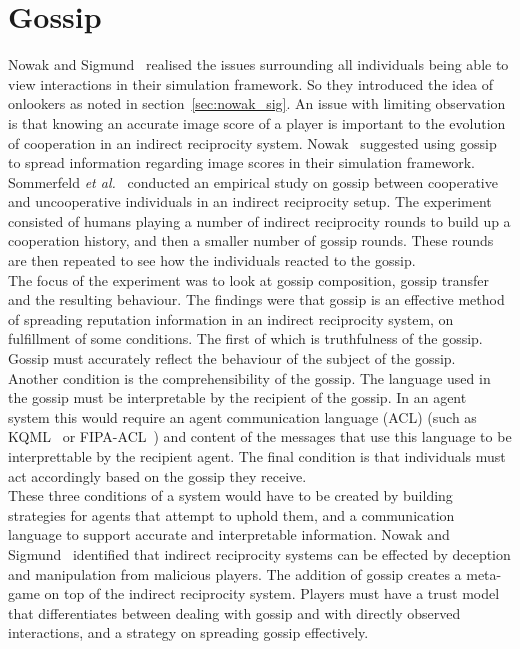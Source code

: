 \documentclass[]{final_report}
\begin{document}
\section{Gossip}
Nowak and Sigmund~\cite{evol_indirect_image} realised the issues surrounding all individuals being able to view interactions in their simulation framework. So they introduced the idea of onlookers as noted in section~\ref{sec:nowak_sig}. An issue with limiting observation is that knowing an accurate image score of a player is important to the evolution of cooperation in an indirect reciprocity system. Nowak~\cite{five_rules_coop} suggested using gossip to spread information regarding image scores in their simulation framework.\\
Sommerfeld \textit{et al.}~\cite{gossip_alt} conducted an empirical study on gossip between cooperative and uncooperative individuals in an indirect reciprocity setup. The experiment consisted of humans playing a number of indirect reciprocity rounds to build up a cooperation history, and then a smaller number of gossip rounds. These rounds are then repeated to see how the individuals reacted to the gossip.\\
The focus of the experiment was to look at gossip composition, gossip transfer and the resulting behaviour. The findings were that gossip is an effective method of spreading reputation information in an indirect reciprocity system, on fulfillment of some conditions. The first of which is truthfulness of the gossip. Gossip must accurately reflect the behaviour of the subject of the gossip.\\
Another condition is the comprehensibility of the gossip. The language used in the gossip must be interpretable by the recipient of the gossip. In an agent system this would require an agent communication language (ACL) (such as KQML~\cite{finin1994kqml} or FIPA-ACL~\cite{o1998fipa}) and content of the messages that use this language to be interprettable by the recipient agent. The final condition is that individuals must act accordingly based on the gossip they receive.\\
These three conditions of a system would have to be created by building strategies for agents that attempt to uphold them, and a communication language to support accurate and interpretable information. Nowak and Sigmund~\cite{evol_indirect_image} identified that indirect reciprocity systems can be effected by deception and manipulation from malicious players. The addition of gossip creates a meta-game on top of the indirect reciprocity system. Players must have a trust model that differentiates between dealing with gossip and with directly observed interactions, and a strategy on spreading gossip effectively.
\end{document}
